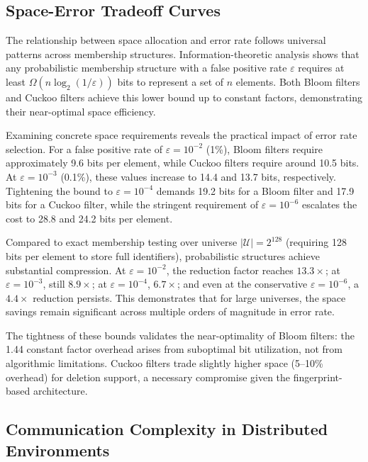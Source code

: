\subsection{Space-Error Tradeoff Curves}

The relationship between space allocation and error rate follows universal patterns across membership structures. Information-theoretic analysis shows that any probabilistic membership structure with a false positive rate $\varepsilon$ requires at least $\Omega(n \log_2(1/\varepsilon))$ bits to represent a set of $n$ elements. Both Bloom filters and Cuckoo filters achieve this lower bound up to constant factors, demonstrating their near-optimal space efficiency.

Examining concrete space requirements reveals the practical impact of error rate selection. For a false positive rate of $\varepsilon = 10^{-2}$ (1\%), Bloom filters require approximately 9.6 bits per element, while Cuckoo filters require around 10.5 bits. At $\varepsilon = 10^{-3}$ (0.1\%), these values increase to 14.4 and 13.7 bits, respectively. Tightening the bound to $\varepsilon = 10^{-4}$ demands 19.2 bits for a Bloom filter and 17.9 bits for a Cuckoo filter, while the stringent requirement of $\varepsilon = 10^{-6}$ escalates the cost to 28.8 and 24.2 bits per element.

Compared to exact membership testing over universe $|\mathcal{U}| = 2^{128}$ (requiring 128 bits per element to store full identifiers), probabilistic structures achieve substantial compression. At $\varepsilon = 10^{-2}$, the reduction factor reaches $13.3\times$; at $\varepsilon = 10^{-3}$, still $8.9\times$; at $\varepsilon = 10^{-4}$, $6.7\times$; and even at the conservative $\varepsilon = 10^{-6}$, a $4.4\times$ reduction persists. This demonstrates that for large universes, the space savings remain significant across multiple orders of magnitude in error rate.

The tightness of these bounds validates the near-optimality of Bloom filters: the 1.44 constant factor overhead arises from suboptimal bit utilization, not from algorithmic limitations. Cuckoo filters trade slightly higher space (5--10\% overhead) for deletion support, a necessary compromise given the fingerprint-based architecture.

\subsection{Communication Complexity in Distributed Environments}

